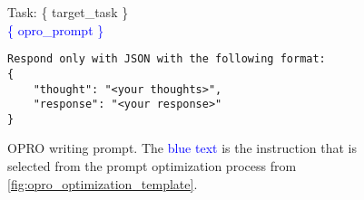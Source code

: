\begin{figure*}
    \centering
\begin{tcolorbox}[width=\textwidth]
\fontsize{8pt}{8pt}\selectfont\ttfamily 
Task: \{ target\_task \} \\ 
\textcolor{blue}{\{ opro\_prompt \}}

\begin{verbatim}
Respond only with JSON with the following format:
{
    "thought": "<your thoughts>",
    "response": "<your response>"
}
\end{verbatim}

\end{tcolorbox}

    \caption{OPRO writing prompt. The \textcolor{blue}{blue text} is the instruction that is selected from the prompt optimization process from \autoref{fig:opro_optimization_template}.}
    \label{fig:opro_writing_template}
\end{figure*}
